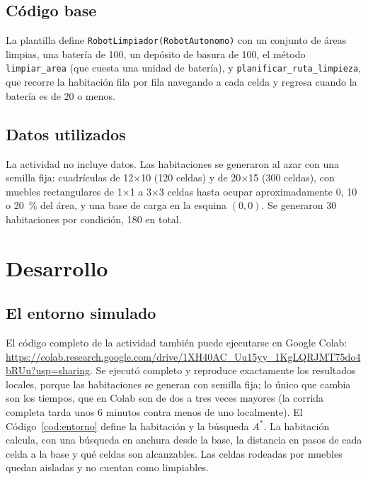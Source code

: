 \documentclass[11pt,letterpaper]{article}
\begin{document}
\subsection*{Código base}

La plantilla define \texttt{RobotLimpiador(RobotAutonomo)} con un conjunto de áreas limpias, una batería de 100, un depósito de basura de 100, el método \texttt{limpiar\_area} (que cuesta una unidad de batería), y \texttt{planificar\_ruta\_limpieza}, que recorre la habitación fila por fila navegando a cada celda y regresa cuando la batería es de 20 o menos.

\subsection*{Datos utilizados}

La actividad no incluye datos. Las habitaciones se generaron al azar con una semilla fija: cuadrículas de 12$\times$10 (120 celdas) y de 20$\times$15 (300 celdas), con muebles rectangulares de 1$\times$1 a 3$\times$3 celdas hasta ocupar aproximadamente 0, 10 o 20~\% del área, y una base de carga en la esquina $(0, 0)$. Se generaron 30 habitaciones por condición, 180 en total.

\newpage

\section{Desarrollo}

\subsection{El entorno simulado}

El código completo de la actividad también puede ejecutarse en Google Colab: \url{https://colab.research.google.com/drive/1XH40AC_Uu15yy_1KgLQRJMT75do4bRUu?usp=sharing}. Se ejecutó completo y reproduce exactamente los resultados locales, porque las habitaciones se generan con semilla fija; lo único que cambia son los tiempos, que en Colab son de dos a tres veces mayores (la corrida completa tarda unos 6 minutos contra menos de uno localmente). El Código~\ref{cod:entorno} define la habitación y la búsqueda $A^*$. La habitación calcula, con una búsqueda en anchura desde la base, la distancia en pasos de cada celda a la base y qué celdas son alcanzables. Las celdas rodeadas por muebles quedan aisladas y no cuentan como limpiables.
\end{document}
